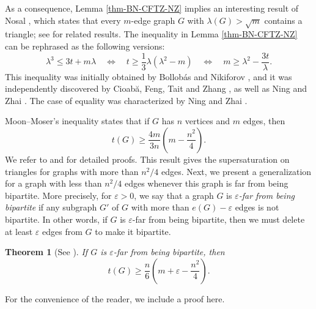 \documentclass[11pt]{article}
\newtheorem{theorem}{Theorem}[section]
\begin{document}
      
      
As a consequence, Lemma \ref{thm-BN-CFTZ-NZ} implies an interesting result of Nosal \cite{Nosal1970}, which states that every $m$-edge graph $G$ with  $\lambda (G)> \sqrt{m}$ contains a triangle; see \cite{Niki2002cpc,Ning2017-ars} for related results. 
The inequality in Lemma \ref{thm-BN-CFTZ-NZ} can be rephrased as the following versions: 
\begin{equation*} 
   \lambda^3 \le 3t + m \lambda 
\quad \Leftrightarrow \quad {t\ge \frac{1}{3}\lambda (\lambda^2 - m)  } 
\quad \Leftrightarrow \quad m \ge \lambda^2- \frac{3t}{\lambda}. 
\end{equation*}
This inequality was initially obtained by 
Bollob\'{a}s and Nikiforov \cite[Theorem 1]{BN2007jctb}, 
and it was independently discovered by Cioab\u{a},  Feng, 
Tait and Zhang \cite{CFTZ20}, as well as Ning and Zhai \cite{NZ2021}.  
The case of equality was characterized by Ning and Zhai \cite{NZ2021}. 



\medskip 
Moon--Moser's inequality states that if 
$G$ has $n$ vertices and $m$ edges, 
then 
\[ t(G)\ge \frac{4m}{3n} \left( m - \frac{n^2}{4} \right). \]  
We refer to \cite[p. 297]{Bollobas78} and \cite[p. 443]{Lov1979} for detailed proofs. 
This result gives the supersaturation on triangles 
for graphs with more than $n^2/4$ edges. 
Next, we present a generalization for a graph with 
less than $n^2/4$ edges whenever this graph 
is far from being bipartite. 
More precisely, for $\varepsilon >0$, 
we say that a graph $G$ is {\it $\varepsilon$-far from being bipartite} if 
any subgraph $G'$ of $G$ 
with more than $e(G)-\varepsilon$ edges is not bipartite. 
In other words, 
if $G$ is $\varepsilon$-far from being bipartite, then we must  
delete at least $\varepsilon$ edges from $G$ to make it bipartite. 


\begin{theorem}[See \cite{BBCLMS2017}] \label{thm-far-bipartite} 
If $G$ is $\varepsilon$-far from being bipartite, then 
\[ t(G) \ge \frac{n}{6}\left( m +\varepsilon-\frac{n^2}{4}\right).  \] 
\end{theorem}  

For the convenience of the reader, we include a proof here.  
\end{document}
